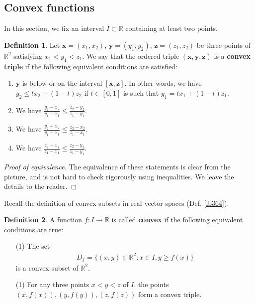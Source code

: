 \documentclass[12pt,b5paper,notitlepage]{article}
\theoremstyle{definition}
\newtheorem{df}{Definition}[section]
\theoremstyle{plain}
\newcommand{\mbf}{\mathbf}
\newcommand{\Rbb}{\mathbb R}
\newcommand{\dps}{\displaystyle}
\numberwithin{equation}{section}
\begin{document}
\subsection{Convex functions}






In this section, we fix an interval $I\subset\Rbb$ containing at least two points.


\begin{df}
Let $\mbf x=(x_1,x_2)$, $\mbf y=(y_1,y_2)$, $\mbf z=(z_1,z_2)$ be three points of $\Rbb^2$ satisfying $x_1<y_1<z_1$. We say that the ordered triple $(\mbf x,\mbf y,\mbf z)$ is a \textbf{convex triple}  if  the following equivalent conditions are satisfied:
\begin{enumerate}[label=(\arabic*)]
\item $\mbf y$ is below or on the interval $[\mbf x,\mbf z]$. In other words, we have $y_2\leq tx_2+(1-t)z_2$ if $t\in[0,1]$ is such that $y_1= tx_1+(1-t)z_1$.
\item We have $\dps \frac{y_2-x_2}{y_1-x_1}\leq \frac{z_2-y_2}{z_1-y_1}$.
\item We have $\dps \frac{y_2-x_2}{y_1-x_1}\leq \frac{z_2-x_2}{z_1-x_1}$.
\item We have $\dps \frac{z_2-x_2}{z_1-x_1}\leq\frac{z_2-y_2}{z_1-y_1}$.
\end{enumerate}
\end{df}

\begin{proof}[Proof of equivalence]
The equivalence of these statements is clear from the picture, and is not hard to check rigorously using inequalities. We leave the details to the reader.
\end{proof}


Recall the definition of convex subsets in real vector spaces (Def. \ref{lb364}).

\begin{df}
A function $f:I\rightarrow\Rbb$ is called \textbf{convex} if the following equivalent conditions are true:
\begin{enumerate}
\item[(1)] The set
\begin{align}
D_f=\{(x,y)\in\Rbb^2:x\in I,y\geq f(x)\}\label{eq147}
\end{align}
is a convex subset of $\Rbb^2$. 
\item[(1)] For any three points $x<y<z$ of $I$, the points $(x,f(x)),(y,f(y)),(z,f(z))$ form a convex triple.
\end{enumerate}
\end{df}
\end{document}
